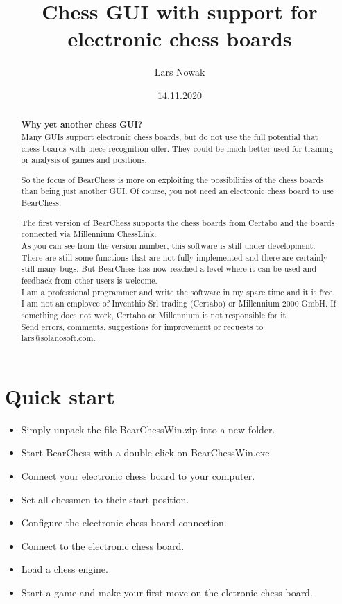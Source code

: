 \documentclass[11pt,a4paper]{article}
\title{Chess GUI with support for electronic chess boards}
\author{Lars Nowak}
\date{14.11.2020}
\begin{document}
\maketitle

\begin{abstract}
\textbf{Why yet another chess GUI?}\\

Many GUIs support electronic chess boards, but do not use the full potential that chess boards with piece recognition offer. They could be much better used for training or analysis of games and positions.

So the focus of BearChess is more on exploiting the possibilities of the chess boards than being just another GUI. Of course, you not need an electronic chess board to use BearChess.

The first version of BearChess supports the chess boards from Certabo and the boards connected via Millennium ChessLink.\\

As you can see from the version number, this software is still under development. There are still some functions that are not fully implemented and there are certainly still many bugs. But BearChess has now reached a level where it can be used and feedback from other users is welcome.\\

I am a professional programmer and write the software in my spare time and it is free. I am not an employee of Inventhio Srl trading (Certabo) or Millennium 2000 GmbH. If something does not work, Certabo or Millennium is not responsible for it.\\

Send errors, comments, suggestions for improvement or requests to lars@solanosoft.com.

\end{abstract}

\newpage
\tableofcontents
\newpage


\section{Quick start}
\begin{itemize}
	\item Simply unpack the file BearChessWin.zip into a new folder.
	\item Start BearChess with a double-click on BearChessWin.exe
	\item Connect your electronic chess board to your computer.
	\item Set all chessmen to their start position.
	\item Configure the electronic chess board connection.
	\item Connect to the electronic chess board.
	\item Load a chess engine.
	\item Start a game and make your first move on the eletronic chess board.
\end{itemize}
\end{document}
